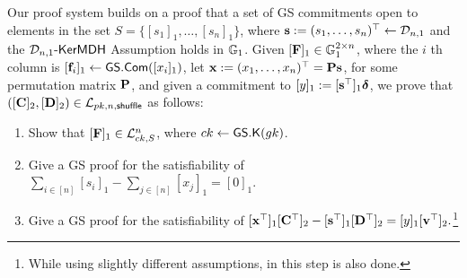Our proof system builds on a proof that a set of GS commitments open to elements in the set $S=\{[s_1]_1,\ldots,[s_n]_1\}$, where $\mathbf{s}:=(s_1,\ldots,s_n)^\top\gets\mathcal{D}_{n,1}$ and the $\mathcal{D}_{n,1}\mbox{-}\mathsf{KerMDH}$ Assumption holds in $\mathbb{G}_1$. Given $[\mathbf{{F}}]_1\in\mathbb{G}_1^{2\times n}$, where the $i$ th column is $[\mathbf{f}_i]_1\gets{\mathsf{GS}}.\mathsf{Com}([x_i]_1)$, let $\mathbf{x}:=({x}_1,\ldots,{x}_n)^\top=\mathbf{{P}}\mathbf{s}$, for some permutation matrix $\mathbf{{P}}$, and given a commitment to $[y]_1:=[\mathbf{s}^\top]_1{\boldsymbol \delta}$, we prove that $([\mathbf{{C}}]_2,[\mathbf{{D}}]_2)\in\mathcal{L}_{pk,n,\mathsf{shuffle}}$ as follows:
\begin{enumerate}[label=\alph*)]
\item Show that $[\mathbf{{F}}]_1\in\mathcal{L}_{ck,S}^n$, where $ck\gets{\mathsf{GS}}.\mathsf{K}({gk})$.\label{shuffle:a}
\item Give a GS proof for the satisfiability of $\sum_{i\in[n]}[s_i]_1-\sum_{j\in[n]}[{x}_j]_1=[0]_1$.\label{shuffle:b}
\item Give a GS proof for the satisfiability of
$
[\mathbf{x}^\top]_1[\mathbf{{C}}^\top]_2-[\mathbf{s}^\top]_1[\mathbf{{D}}^\top]_2=[y]_1[\mathbf{v}^\top]_2.\label{shuffle:c}
$\footnote{While using slightly different assumptions, in \cite{AC:GroLu07} this step is also done.}
\end{enumerate}

